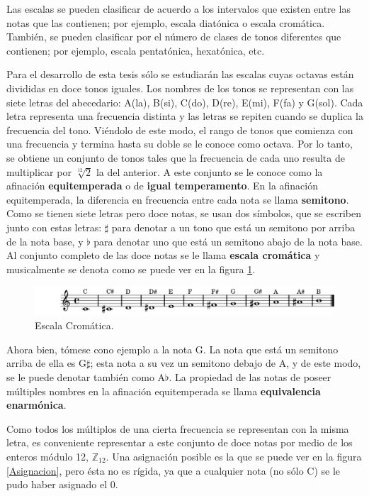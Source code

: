 \documentclass[letterpaper,12pt]{book}
\theoremstyle{definition} \newtheorem{Def}{Definición}[chapter]
\theoremstyle{definition} \newtheorem{Teo}{Teorema}[chapter]
\theoremstyle{definition} \newtheorem{Pro}{Proposición}[chapter]
\theoremstyle{definition} \newtheorem{Lema}{Lema}[chapter]
\begin{document}
Las escalas se pueden clasificar de acuerdo a los intervalos que existen entre las notas que las contienen; por ejemplo, escala diatónica o escala cromática. También, se pueden clasificar por el número de clases de tonos diferentes que contienen; por ejemplo, escala pentatónica, hexatónica, etc.

Para el desarrollo de esta tesis sólo se estudiarán las escalas cuyas octavas están divididas en doce tonos iguales. Los nombres de los tonos se representan con las siete letras del abecedario: A(la), B(si), C(do), D(re), E(mi), F(fa) y G(sol). Cada letra representa una frecuencia distinta y las letras se repiten cuando se duplica la frecuencia del tono. Viéndolo de este modo, el rango de tonos que comienza con una frecuencia y termina hasta su doble se le conoce como octava. Por lo tanto, se obtiene un conjunto de tonos tales que la frecuencia de cada uno resulta de multiplicar por $\sqrt[12]{2}$ la del anterior. A este conjunto se le conoce como la afinación \textbf{equitemperada} o de \textbf{igual temperamento}. En la afinación equitemperada, la diferencia en frecuencia entre cada nota se llama \textbf{semitono}. Como se tienen siete letras pero doce notas, se usan dos símbolos, que se escriben junto con estas letras: $\sharp$ para denotar a un tono que está un semitono por arriba de la nota base, y $\flat$ para denotar uno que está un semitono abajo de la nota base. Al conjunto completo de las doce notas se le llama \textbf{escala cromática} y musicalmente se denota como se puede ver en la figura \ref{Cromatica}.
\begin{figure}[h]
\centering
\includegraphics[angle=0, width=1\textwidth]{Cromatica.png}
\caption{\label{Cromatica}Escala Cromática.}
\end{figure}
Ahora bien, tómese cono ejemplo a la nota G. La nota que está un semitono arriba de ella es G$\sharp$; esta nota a su vez un semitono debajo de A, y de este modo, se le puede denotar también como A$\flat$. La propiedad de las notas de poseer múltiples nombres en la afinación equitemperada se llama \textbf{equivalencia enarmónica}.

Como todos los múltiplos de una cierta frecuencia se representan con la misma letra, es conveniente representar a este conjunto de doce notas por medio de los enteros módulo 12, $\mathbb{Z}_{12}$. Una asignación posible es la que se puede ver en la figura \ref{Asignacion}, pero ésta no es rígida, ya que a cualquier nota (no sólo C) se le pudo haber asignado el $0$.
\end{document}
